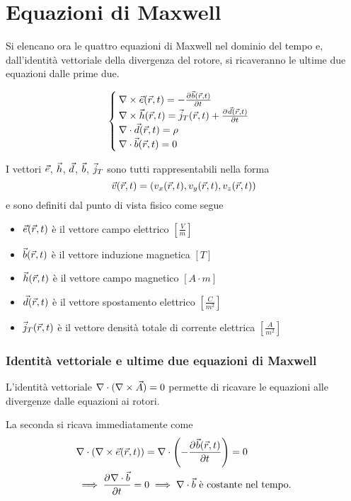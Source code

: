 \section{Equazioni di Maxwell}
Si elencano ora le quattro equazioni di Maxwell nel dominio del tempo e, dall'identità
vettoriale della divergenza del rotore, si ricaveranno le ultime due equazioni dalle prime due.

\begin{equation}\begin{cases}
  \nabla\times \vec{e}(\vec{r},t) = -\frac{\partial^{} {\vec{b}(\vec{r},t)}}{\partial {t}^{}} \\
  \nabla\times \vec{h}(\vec{r},t) = \vec{j}_T(\vec{r},t) + \frac{\partial^{} {\vec{d}(\vec{r},t)}}{\partial {t}^{}} \\
  \nabla\cdot \vec{d}(\vec{r},t) = \rho \\
  \nabla\cdot \vec{b}(\vec{r},t) = 0
\end{cases}\label{eq:maxwell}\end{equation}

I vettori $\vec{e}$, $\vec{h}$, $\vec{d}$, $\vec{b}$, $\vec{j}_T$ sono tutti rappresentabili nella forma
$$\vec{v}(\vec{r},t) = \left(v_x(\vec{r},t), v_y(\vec{r},t), v_z(\vec{r},t)\right)$$
e sono definiti dal punto di vista fisico come segue
\begin{itemize}
  \item $\vec{e}(\vec{r},t)$ è il vettore campo elettrico $\left[\frac{V}{m}\right]$
  \item $\vec{b}(\vec{r},t)$ è il vettore induzione magnetica $[T]$
  \item $\vec{h}(\vec{r},t)$ è il vettore campo magnetico $[A \cdot m]$
  \item $\vec{d}(\vec{r},t)$ è il vettore spostamento elettrico $\left[\frac{C}{m^2}\right]$
  \item $\vec{j}_T(\vec{r}, t)$ è il vettore densità totale di corrente elettrica $\left[\frac{A}{m^2}\right]$
\end{itemize}

\subsubsection{Identità vettoriale e ultime due equazioni di Maxwell}
L'identità vettoriale $\nabla\cdot (\nabla\times \vec{A}) = 0$ permette di ricavare
le equazioni alle divergenze dalle equazioni ai rotori.

La seconda si ricava immediatamente come
\begin{equation}\begin{split}
  & \nabla\cdot (\nabla\times \vec{e}(\vec{r},t)) = \nabla\cdot \left(-\frac{\partial^{} {\vec{b}(\vec{r},t)}}{\partial {t}^{}}\right)=0 \\
	& \implies \frac{\partial^{} {\nabla\cdot \vec{b}}}{\partial {t}^{}}=0 \implies \nabla\cdot \vec{b} \text{ è costante nel tempo.}\\
\end{split}\end{equation}

